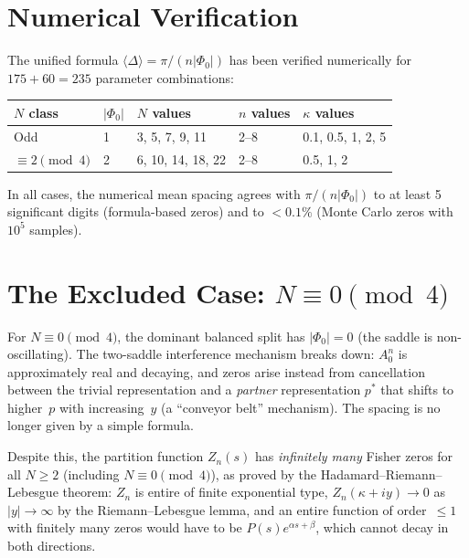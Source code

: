 \documentclass[12pt]{article}
\theoremstyle{remark}
\newcommand{\avg}[1]{\langle #1 \rangle}
\begin{document}
\section{Numerical Verification}\label{sec:numerics}

The unified formula $\avg{\Delta} = \pi/(n|\Phi_0|)$ has been verified
numerically for $175 + 60 = 235$ parameter combinations:

\begin{center}
\begin{tabular}{lllll}
\toprule
$N$ class & $|\Phi_0|$ & $N$ values & $n$ values & $\kappa$ values \\
\midrule
Odd        & 1 & 3, 5, 7, 9, 11  & 2--8 & 0.1, 0.5, 1, 2, 5 \\
$\equiv 2\!\pmod{4}$ & 2 & 6, 10, 14, 18, 22 & 2--8 & 0.5, 1, 2 \\
\bottomrule
\end{tabular}
\end{center}

In all cases, the numerical mean spacing agrees with $\pi/(n|\Phi_0|)$
to at least 5 significant digits (formula-based zeros) and to $< 0.1\%$
(Monte Carlo zeros with $10^5$ samples).


\section{The Excluded Case: $N \equiv 0 \pmod{4}$}\label{sec:excluded}

For $N \equiv 0 \pmod{4}$, the dominant balanced split has $|\Phi_0| = 0$
(the saddle is non-oscillating). The two-saddle interference mechanism
breaks down: $A_0^n$ is approximately real and decaying, and zeros arise
instead from cancellation between the trivial representation and a
\emph{partner} representation $p^*$ that shifts to higher~$p$ with
increasing~$y$ (a ``conveyor belt'' mechanism). The spacing is no longer
given by a simple formula.

Despite this, the partition function $Z_n(s)$ has \emph{infinitely many}
Fisher zeros for all $N \geq 2$ (including $N \equiv 0 \pmod{4}$), as
proved by the Hadamard--Riemann--Lebesgue theorem:
$Z_n$ is entire of finite exponential type, $Z_n(\kappa + iy) \to 0$
as $|y| \to \infty$ by the Riemann--Lebesgue lemma, and an entire
function of order~$\leq 1$ with finitely many zeros would have to be
$P(s) e^{\alpha s + \beta}$, which cannot decay in both directions.
\end{document}

